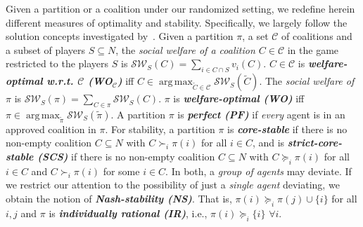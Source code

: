 \documentclass[letterpaper]{article}
\DeclareMathOperator*{\argmax}{arg\,max}
\begin{document}
Given a partition or a coalition under our randomized setting, we redefine herein different measures of optimality and stability. Specifically, we largely follow the solution concepts investigated by~\cite{peters2016complexity}. %
Given a partition $\pi$, a set $\mathcal{C}$ of coalitions and a subset of players $S \subseteq N$, the \textit{social welfare of a coalition $C \in \mathcal{C}$} in the game restricted to the players $S$ is $\mathcal{SW}_S(C) = \sum_{i \in C \cap S} v_i(C)$. $C \in \mathcal{C}$ is \textit{\textbf{welfare-optimal w.r.t. $\mathbf{\mathcal{C}}$ (WO$\mathbf{_\mathcal{C}}$)}} iff $C \in \argmax_{\tilde{C} \in \mathcal{C}} \mathcal{SW}_S(\tilde{C})$. The \textit{social welfare of $\pi$} is $\mathcal{SW}_S(\pi) = \sum_{C \in \pi} \mathcal{SW}_S(C)$. $\pi$ is \textit{\textbf{welfare-optimal (WO)}} iff $\pi \in \argmax_{\tilde{\pi}} \mathcal{SW}_S(\tilde{\pi})$.
A partition $\pi$ is \textit{\textbf{perfect (PF)}} if \textit{every} agent is in an approved coalition in $\pi$. %
For stability, a partition $\pi$ is \textit{\textbf{core-stable}} if there is no non-empty coalition $C \subseteq N$ with $C \succ_i \pi(i)$ for all $i \in C$, and is \textit{\textbf{strict-core-stable (SCS)}} if there is no non-empty coalition $C\subseteq N$ with $C \succeq_i \pi(i)$ for all $i \in C$ and $C \succ_i \pi(i)$ for some $i \in C$. In both, a \textit{group of agents} may deviate. If we restrict our attention to the possibility of just a \textit{single agent} deviating, we obtain the notion of \textit{\textbf{Nash-stability (NS)}}. That is, $\pi(i) \succeq_i \pi(j) \cup \{i\}$ for all $i,j$ and $\pi$ is \textit{\textbf{individually rational (IR)}}, i.e., $\pi(i) \succeq_i \{i\}$ $\forall i$. %
\end{document}
